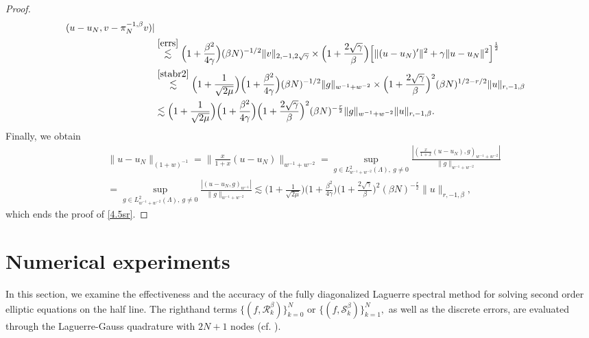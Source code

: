 \documentclass[10pt,reqno]{amsart}
\theoremstyle{remark}
\theoremstyle{definition}
\begin{document}
\begin{proof}
\begin{align*}
(u-u_{N},v-\pi^{-1,\beta}_Nv)|
\\
&\overset{\eqref{errs}} \lesssim  \Big(1+\frac{\beta^2}{4\gamma}
\Big)  (\beta N)^{-1/2}  \|v\|_{2,-1,2\sqrt{\gamma}}\times
\Big(1+\frac{2\sqrt{\gamma}}{\beta}\Big)  \Big[
\|(u-u_{N})^\prime\|^2  + \gamma\| u-u_{N}\|^2\Big]^{\frac12}
\\
&\overset{\eqref{stabr2}}\lesssim  \Big(1+\frac{1}{\sqrt{2\mu}}\Big)\Big(1+\frac{\beta^2}{4\gamma}
\Big)
 (\beta N)^{-1/2}  \|g\|_{w^{-1}+w^{-2}} \times  \Big(1+\frac{2\sqrt{\gamma}}{\beta}\Big)^2  (\beta N)^{1/2-r/2}   \|u\|_{r,-1,\beta}
\\
&  \lesssim   \Big(1+\frac{1}{\sqrt{2\mu}}\Big)\Big(1+\frac{\beta^2}{4\gamma} \Big)
\Big(1+\frac{2\sqrt{\gamma}}{\beta}\Big)^2    (\beta
N)^{-\frac{r}{2}}  \|g\|_{w^{-1}+w^{-2}}  \|u\|_{r,-1,\beta}.
\end{align*}
Finally, we obtain
\begin{align*}&\|u-u_N\|_{(1+w)^{-1}}=\|\frac{x}{1+x}(u-u_N)\|_{w^{-1}+w^{-2}}=\sup_{g\in L^2_{w^{-1}+w^{-2}}(\Lambda),~g\neq 0}\frac{|(\frac{x}{1+x}(u-u_N),g)_{w^{-1}+w^{-2}}|}{\|g\|_{w^{-1}+w^{-2}}}
\\&=\sup_{g\in L^2_{w^{-1}+w^{-2}}(\Lambda),~g\neq 0}\frac{|(u-u_N,g)_{w^{-1}}|}{\|g\|_{w^{-1}+w^{-2}}}
\lesssim  \Big(1+\frac{1}{\sqrt{2\mu}}\Big) \Big(1+\frac{\beta^2}{4\gamma} \Big)
\Big(1+\frac{2\sqrt{\gamma}}{\beta}\Big)^2    (\beta
N)^{-\frac{r}{2}} \|u\|_{r,-1,\beta},\end{align*}
 which ends the proof of \eqref{4.5sr}.
\end{proof}

\section{Numerical experiments}\setcounter{equation}{0} \setcounter{lmm}{0} \setcounter{thm}{0} \setcounter{table}{0}
In this section, we examine the effectiveness and the accuracy of  the fully diagonalized Laguerre spectral method
for solving second order elliptic equations on the half line.
The righthand terms $\{(f,\mathcal{R}_k^{\beta})\}_{k=0}^N$ or  $\{(f,\mathcal{S}_k^{\beta})\}_{k=1}^N,$  as well as the discrete errors,
are evaluated through the Laguerre-Gauss quadrature with $2N+1$ nodes (cf. \cite{WGW}).
\end{document}

